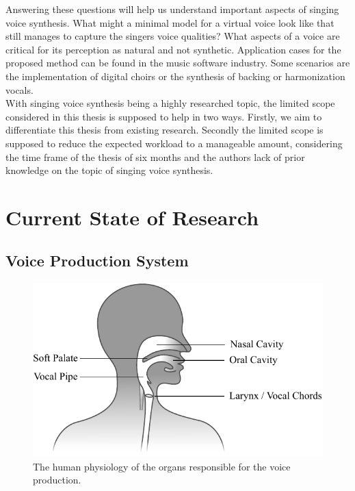 \documentclass{article}
\newcommand{\comment}[1]{{\color{red}{[#1]}}}
\begin{document}
Answering these questions will help us understand important aspects of singing voice synthesis. What might a minimal model for a virtual voice look like that still manages to capture the singers voice qualities? What aspects of a voice are critical for its perception as natural and not synthetic. Application cases for the proposed method can be found in the music software industry. Some scenarios are the implementation of digital choirs or the synthesis of backing or harmonization vocals.\\

With singing voice synthesis being a highly researched topic, the limited scope considered in  this thesis is supposed to help in two ways. Firstly, we aim to differentiate this thesis from existing research. Secondly the limited scope is supposed to reduce the expected workload to a manageable amount, considering the time frame of the thesis of six months and the authors lack of prior knowledge on the topic of singing voice synthesis. \comment{Not sure if this "meta" block is necessary.}


\section{Current State of Research}

\subsection{Voice Production System}

\begin{figure} [H]
    \centering
    \includegraphics{Graphics/002_VoiceProduction_Physiology.pdf}
    \caption{The human physiology of the organs responsible for the voice production.}
    \label{fig:physiology}
\end{figure}
\end{document}
